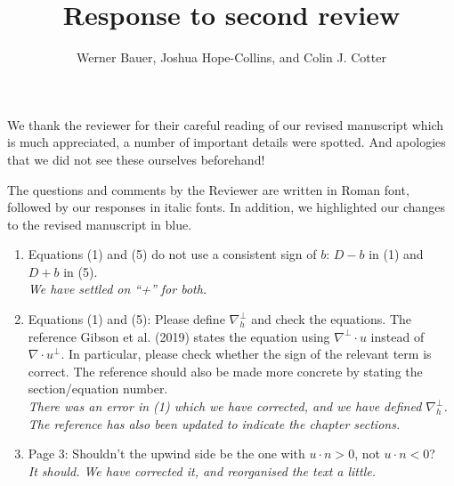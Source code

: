 \documentclass[a4paper,12pt]{article}
\title{Response to second review}
\author{Werner Bauer, Joshua Hope-Collins, and Colin J. Cotter}
\newcommand{\colin}[1]{{\color{blue}CJC says: #1}}
\DeclareMathOperator{\diff}{d}
\begin{document}
\maketitle

We thank the reviewer for their careful reading of our revised manuscript
which is much appreciated, a number of important details were spotted. And
apologies that we did not see these ourselves beforehand!

The questions and comments by the Reviewer are written in Roman font,
followed by our responses in italic fonts. In addition, we highlighted
our changes to the revised manuscript in blue.

\begin{enumerate}
\item Equations (1) and (5) do not use a consistent sign of $b$: $D-b$ in (1) and $D+b$ in (5).\\
  \emph{We have settled on ``+'' for both.}
\item Equations (1) and (5): Please define $\nabla^\perp_h$ and check
  the equations. The reference Gibson et al. (2019) states the
  equation using $\nabla^\perp \cdot u$ instead of $\nabla \cdot
  u^\perp$. In particular, please check whether the sign of the
  relevant term is correct. The reference should also be made more
  concrete by stating the section/equation number.\\ \emph{There was
  an error in (1) which we have corrected, and we have defined
  $\nabla^\perp_h$. The reference has also been updated to indicate the
  chapter sections.}

%
\item Page 3: Shouldn't the upwind side be the one with $u \cdot n > 0$, not $u \cdot n < 0$?\\
  \emph{It should. We have corrected it, and reorganised the text a little.}



\end{enumerate}
\end{document}
